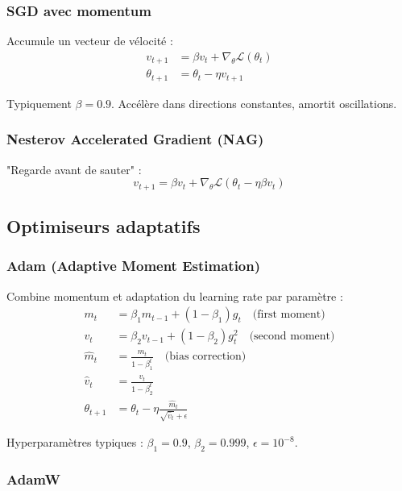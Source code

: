 \subsubsection{SGD avec momentum}

Accumule un vecteur de vélocité :
\begin{align*}
v_{t+1} &= \beta v_t + \nabla_\theta \mathcal{L}(\theta_t) \\
\theta_{t+1} &= \theta_t - \eta v_{t+1}
\end{align*}

Typiquement $\beta = 0.9$. Accélère dans directions constantes, amortit oscillations.

\subsubsection{Nesterov Accelerated Gradient (NAG)}

"Regarde avant de sauter" :
\[
v_{t+1} = \beta v_t + \nabla_\theta \mathcal{L}(\theta_t - \eta \beta v_t)
\]

\subsection{Optimiseurs adaptatifs}

\subsubsection{Adam (Adaptive Moment Estimation)}

Combine momentum et adaptation du learning rate par paramètre :
\begin{align*}
m_t &= \beta_1 m_{t-1} + (1-\beta_1) g_t \quad \text{(first moment)} \\
v_t &= \beta_2 v_{t-1} + (1-\beta_2) g_t^2 \quad \text{(second moment)} \\
\hat{m}_t &= \frac{m_t}{1 - \beta_1^t} \quad \text{(bias correction)} \\
\hat{v}_t &= \frac{v_t}{1 - \beta_2^t} \\
\theta_{t+1} &= \theta_t - \eta \frac{\hat{m}_t}{\sqrt{\hat{v}_t} + \epsilon}
\end{align*}

Hyperparamètres typiques : $\beta_1 = 0.9$, $\beta_2 = 0.999$, $\epsilon = 10^{-8}$.

\subsubsection{AdamW}

